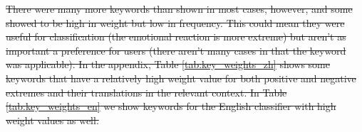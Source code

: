 \documentclass[smallextended,natbib]{svjour3}       %
\providecommand{\DIFdel}[1]{{\protect\color{red}\sout{#1}}}                      %
\providecommand{\DIFdelbegin}{} %
\providecommand{\DIFdelendFL}{} %
\newcommand{\DIFscaledelfig}{0.5}
\newlength{\DIFdelgraphicswidth} %
\newlength{\DIFdelgraphicsheight} %
\newcommand{\DIFdelincludegraphics}[2][]{%
\sbox{\DIFdelgraphicsbox}{\DIFOincludegraphics[#1]{#2}}%
\settoboxwidth{\DIFdelgraphicswidth}{\DIFdelgraphicsbox} %
\settoboxtotalheight{\DIFdelgraphicsheight}{\DIFdelgraphicsbox} %
\scalebox{\DIFscaledelfig}{%
\parbox[b]{\DIFdelgraphicswidth}{\usebox{\DIFdelgraphicsbox}\\[-\baselineskip] \rule{\DIFdelgraphicswidth}{0em}}\llap{\resizebox{\DIFdelgraphicswidth}{\DIFdelgraphicsheight}{%
\setlength{\unitlength}{\DIFdelgraphicswidth}%
\begin{picture}(1,1)%
\thicklines\linethickness{2pt} %
{\color[rgb]{1,0,0}\put(0,0){\framebox(1,1){}}}%
{\color[rgb]{1,0,0}\put(0,0){\line( 1,1){1}}}%
{\color[rgb]{1,0,0}\put(0,1){\line(1,-1){1}}}%
\end{picture}%
}\hspace*{3pt}}} %
} %
\DeclareRobustCommand{\DIFdelbegin}{\DIFOdelbegin \let\includegraphics\DIFdelincludegraphics} %
\DeclareRobustCommand{\DIFdelendFL}{\DIFOaddendFL \let\includegraphics\DIFOincludegraphics} %
\begin{document}
\DIFdelbegin \DIFdel{There were many more keywords than shown in most cases, however, and some showed to be high in weight but low in frequency. This could mean they were useful for classification (the emotional reaction is more extreme) but aren't as important a preference for users (there aren't many cases in that the keyword was applicable). In the appendix, Table \ref{tab:key_weights_zh} shows some keywords that have a relatively high weight value for both positive and negative extremes and their translations in the relevant context. In Table \ref{tab:key_weights_en} we show keywords for the English classifier with high weight values as well.
}%


\DIFdelendFL %
\end{document}
